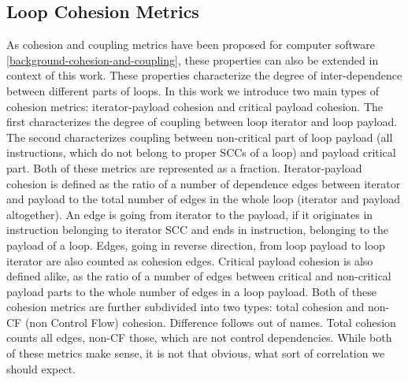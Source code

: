 \subsection{Loop Cohesion Metrics}
\label{metrics-loop-cohesion-metrics}
\qquad As cohesion and coupling metrics have been proposed for computer software \ref{background-cohesion-and-coupling}, these properties can also be extended in context of this work.\newline
\null\qquad These properties characterize the degree of inter-dependence between different parts of loops. In this work we introduce two main types of cohesion metrics: iterator-payload cohesion and critical payload cohesion. The first characterizes the degree of coupling between loop iterator and loop payload. The second characterizes coupling between non-critical part of loop payload (all instructions, which do not belong to proper SCCs of a loop) and payload critical part. Both of these metrics are represented as a fraction.\newline
\null\qquad Iterator-payload cohesion is defined as the ratio of a number of dependence edges between iterator and payload to the total number of edges in the whole loop (iterator and payload altogether). An edge is going from iterator to the payload, if it originates in instruction belonging to iterator SCC and ends in instruction, belonging to the payload of a loop. Edges, going in reverse direction, from loop payload to loop iterator are also counted as cohesion edges.\newline
\null\qquad Critical payload cohesion is also defined alike, as the ratio of a number of edges between critical and non-critical payload parts to the whole number of edges in a loop payload.\newline
\null\qquad Both of these cohesion metrics are further subdivided into two types: total cohesion and non-CF (non Control Flow) cohesion. Difference follows out of names. Total cohesion counts all edges, non-CF those, which are not control dependencies.\newline
\null\qquad While both of these metrics make sense, it is not that obvious, what sort of correlation we should expect.    

